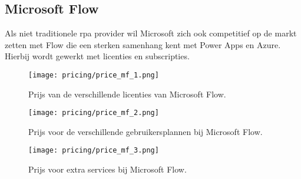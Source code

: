 \subsection{Microsoft Flow}
Als niet traditionele \acrshort{rpa} provider wil Microsoft zich ook competitief op de markt zetten met Flow die een sterken samenhang kent met Power Apps en Azure. Hierbij wordt gewerkt met licenties en subscripties.
\begin{figure}[h!]
	\texttt{[image: pricing/price\_mf\_1.png]}
	\caption[Microsoft Flow licenties]{Prijs van de verschillende licenties van Microsoft Flow.}
	\label{fig:price_mf_1}
\end{figure}

\begin{figure}[h!]
	\texttt{[image: pricing/price\_mf\_2.png]}
	\caption[Microsoft Flow gebruikersplan]{Prijs voor de verschillende gebruikersplannen bij Microsoft Flow.}
	\label{fig:price_mf_2}
\end{figure}

\begin{figure}[h!]
	\texttt{[image: pricing/price\_mf\_3.png]}
	\caption[Microsoft Flow extra services]{Prijs voor extra services bij Microsoft Flow.}
	\label{fig:price_mf_3}
\end{figure}